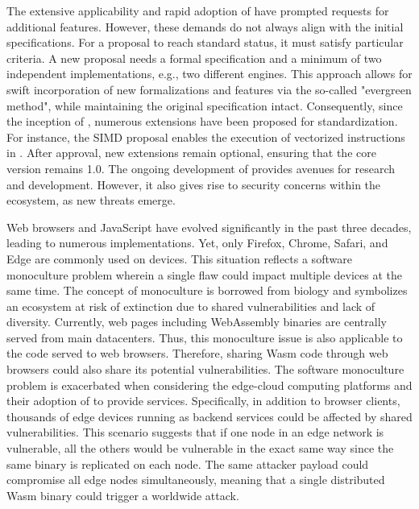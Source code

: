 The extensive applicability and rapid adoption of \Wasm have prompted requests for additional features. 
However, these demands do not always align with the initial specifications. 
For a proposal to reach standard status, it must satisfy particular criteria.
A new proposal needs a formal specification and a minimum of two independent implementations, e.g., two different \Wasm engines. 
This approach allows for swift incorporation of new formalizations and features via the so-called "evergreen method", while maintaining the original \Wasm specification intact. 
Consequently, since the inception of \Wasm, numerous extensions have been proposed for standardization. 
For instance, the SIMD proposal enables the execution of vectorized instructions in \Wasm. 
After approval, new extensions remain optional, ensuring that the core \Wasm version remains 1.0. 
The ongoing development of \Wasm provides avenues for research and development. 
However, it also gives rise to security concerns within the ecosystem, as new threats emerge.




Web browsers and JavaScript have evolved significantly in the past three decades, leading to numerous implementations. 
Yet, only Firefox, Chrome, Safari, and Edge are commonly used on devices.
This situation reflects a software monoculture problem wherein a single flaw could impact multiple devices at the same time. 
The concept of monoculture is borrowed from biology and symbolizes an ecosystem at risk of extinction due to shared vulnerabilities and lack of diversity. 
Currently, web pages including WebAssembly binaries are centrally served from main datacenters. 
Thus, this monoculture issue is also applicable to the \Wasm code served to web browsers. 
Therefore, sharing Wasm code through web browsers could also share its potential vulnerabilities. 
The software monoculture problem is exacerbated when considering the edge-cloud computing platforms and their adoption of \Wasm to provide services.
Specifically, in addition to browser clients, thousands of edge devices running \Wasm as backend services could be affected by shared vulnerabilities. 
This scenario suggests that if one node in an edge network is vulnerable, all the others would be vulnerable in the exact same way since the same binary is replicated on each node. 
The same attacker payload could compromise all edge nodes simultaneously, meaning that a single distributed Wasm binary could trigger a worldwide attack.


